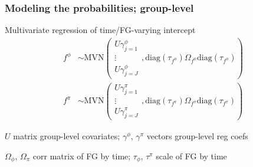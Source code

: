 \documentclass[aspectratio=169]{beamer}
\begin{document}
\begin{frame}
  \frametitle{Modeling the probabilities; group-level}
  \begin{block}{Multivariate regression of time/FG-varying intercept}
    \setlength\abovedisplayskip{-0.3cm}
    \begin{align*}
      f^{\phi} &\sim \text{MVN}\left(
      \begin{matrix}
        U \gamma^{\phi}_{j = 1} \\
        \vdots \\
        U \gamma^{\phi}_{j = J}
      \end{matrix}, 
      \text{diag}(\tau_{f^{\phi}}) \Omega_{f^{\phi}} \text{diag}(\tau_{f^{\phi}}) \right) \\
      f^{\pi} &\sim \text{MVN}\left(
      \begin{matrix}
        U \gamma^{\pi}_{j = 1} \\
        \vdots \\
        U \gamma^{\pi}_{j = J}
      \end{matrix}, 
      \text{diag}(\tau_{f^{\pi}}) \Omega_{f^{\pi}} \text{diag}(\tau_{f^{\pi}}) \right)
    \end{align*}
    \begin{scriptsize}
      \(U\) matrix group-level covariates; \(\gamma^{\phi}\), \(\gamma^{\pi}\) vectors group-level reg coefs

      \(\Omega_{\phi}\), \(\Omega_{\pi}\) corr matrix of FG by time; \(\tau_{\phi}\), \(\tau^{\pi}\) scale of FG by time
    \end{scriptsize}
  \end{block}
\end{frame}
\end{document}
